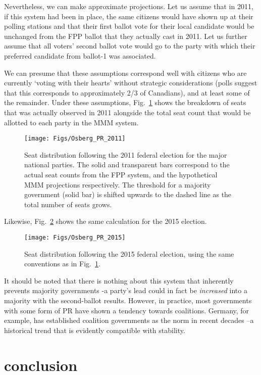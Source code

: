 \documentclass[DIV=calc, paper=a4, fontsize=11pt, twocolumn]{scrartcl}	 %
\begin{document}
Nevertheless, we can make approximate projections. Let us assume that in 2011, if this system had been in place, the same citizens would have shown up at their polling stations and that their first ballot vote for their local candidate would be unchanged from the FPP ballot that they actually cast in 2011. 
Let us further assume that all voters' second ballot vote would go to the party with which their preferred candidate from ballot-1 was associated. 

We can presume that these assumptions correspond well with citizens who are currently `voting with their hearts' without strategic considerations (polls suggest that this corresponds to approximately 2/3 of Canadians), and at least some of the remainder. Under these assumptions, Fig.~\ref{fig:hypo_2011} shows the breakdown of seats that was actually observed in 2011 alongside the total seat count that would be allotted to each party in the MMM system.
\begin{figure}[h!]
  \texttt{[image: Figs/Osberg\_PR\_2011]}
  \caption{ Seat distribution following the 2011 federal election for the major national parties. The solid and transparent bars correspond to the actual seat counts from the FPP system, and the hypothetical MMM projections respectively. The threshold for a majority government (solid bar) is shifted upwards to the dashed line as the total number of seats grows. 
}
\label{fig:hypo_2011}
\end{figure}

Likewise, Fig.~\ref{fig:hypo_2015} shows the same calculation for the 2015 election.

\begin{figure}[h!]
  \texttt{[image: Figs/Osberg\_PR\_2015]}
  \caption{ Seat distribution following the 2015 federal election, using the same conventions as in Fig.~\ref{fig:hypo_2011}.}
\label{fig:hypo_2015}
\end{figure}
It should be noted that there is nothing about this system that inherently prevents majority governments \--a party's lead could in fact be \emph{increased} into a majority with the second-ballot results. However, in practice, most governments with some form of PR have shown a tendency towards coalitions. Germany, for example, has established coalition governments as the norm in recent decades \---a historical trend that is evidently compatible with  stability.


\section{conclusion}	
\end{document}
